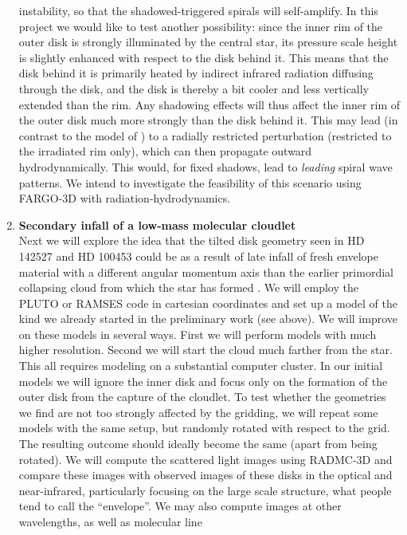 \documentclass[10pt,fleqn,twoside]{article}
\begin{document}
\begin{enumerate}
  instability, so that the shadowed-triggered spirals will self-amplify.  In
  this project we would like to test another possibility: since the inner
  rim of the outer disk is strongly illuminated by the central star, its
  pressure scale height is slightly enhanced with respect to the disk behind
  it. This means that the disk behind it is primarily heated by indirect
  infrared radiation diffusing through the disk, and the disk is thereby a
  bit cooler and less vertically extended than the rim. Any shadowing
  effects will thus affect the inner rim of the outer disk much more
  strongly than the disk behind it. This may lead (in contrast to the model
  of \citet{2016ApJ...823L...8M}) to a radially restricted perturbation
  (restricted to the irradiated rim only), which can then propagate outward
  hydrodynamically. This would, for fixed shadows, lead to {\em leading}
  spiral wave patterns. We intend to investigate the feasibility of this
  scenario using FARGO-3D with radiation-hydrodynamics. 
\item {\bf Secondary infall of a low-mass molecular cloudlet}\\
  Next we will explore the idea that the tilted disk geometry seen in HD
  142527 and HD 100453 could be as a result of late infall of fresh envelope
  material with a different angular momentum axis than the earlier
  primordial collapsing cloud from which the star has formed \citep[the
  scenario by][but now applied to disks]{2011MNRAS.417.1817T}. We will
  employ the PLUTO or RAMSES code in cartesian coordinates and set up a
  model of the kind we already started in the preliminary work (see above).
  We will improve on these models in several ways. First we will perform
  models with much higher resolution. Second we will start the cloud much
  farther from the star. This all requires modeling on a substantial computer
  cluster. In our initial models we will ignore the inner disk and focus
  only on the formation of the outer disk from the capture of the cloudlet.
  To test whether the geometries we find are not too strongly affected by
  the gridding, we will repeat some models with the same setup, but randomly
  rotated with respect to the grid. The resulting outcome should ideally
  become the same (apart from being rotated). We will compute the scattered
  light images using RADMC-3D and compare these images with observed images
  of these disks in the optical and near-infrared, particularly focusing on
  the large scale structure, what people tend to call the ``envelope''.  We
  may also compute images at other wavelengths, as well as molecular line

\end{enumerate}
\end{document}
